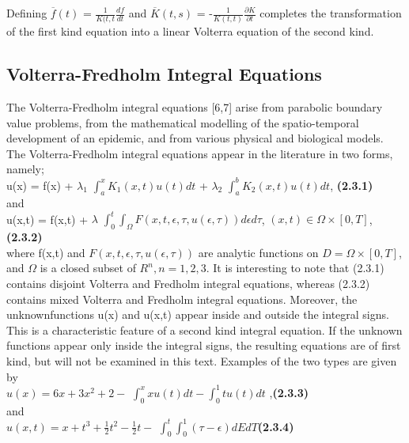 \documentclass[12pt]{article}
\begin{document}
Defining $\overline{f}(t)$ = $\frac{1}{K(t,t} \frac{df}{dt}$ and $\overline{K}(t,s)$ = -$\frac{1}{K(t,t)} \frac{\partial K}{\partial t}$ completes the transformation of the first kind equation into a linear Volterra equation of the second kind.

\subsection{Volterra-Fredholm Integral Equations}
The Volterra-Fredholm integral equations [6,7] arise from parabolic boundary value problems, from the mathematical modelling of the spatio-temporal development of an epidemic, and from various physical and biological models.
The Volterra-Fredholm integral equations appear in the literature in two forms, namely;\\

u(x) = f(x) + $\lambda_{1}$ \(\int_{a}^{x} K_{1}(x,t) u(t) dt\) + $\lambda_{2}$ \(\int_{a}^{b} K_{2}(x,t) u(t) dt\), \textbf{(2.3.1)}\\

and\\

u(x,t) = f(x,t) + $\lambda$ \(\int_{0}^{t} \int_{\Omega}F(x,t,\epsilon ,\tau , u(\epsilon ,\tau)) d\epsilon d\tau\), $(x,t) \in \Omega \times [0,T]$, \textbf{(2.3.2)}\\

where f(x,t) and $F(x,t,\epsilon , \tau,u(\epsilon , \tau))$ are analytic functions on $D = \Omega \times [0,T]$, and $\Omega$ is a closed subset of $R^n ,n =1 ,2,3$. It is interesting to note that (2.3.1) contains disjoint Volterra and Fredholm integral equations, whereas (2.3.2) contains mixed Volterra and Fredholm integral equations. Moreover, the unknownfunctions u(x) and u(x,t) appear inside and outside the integral signs. This is a characteristic feature of a second kind integral equation. If the unknown functions appear only inside the integral signs, the resulting equations are of ﬁrst kind, but will not be examined in this text. Examples of the two types are given by\\

$u(x) = 6x + 3x^2 + 2 -$ \(\int_{0}^{x} xu(t)dt - \int_{0}^{1} tu(t)dt\) ,\textbf{(2.3.3)}\\

and\\

$u(x,t) = x + t^3 + \frac{1}{2} t^2 - \frac{1}{2} t -$ \(\int_{0}^{t} \int_{0}^{1} (\tau - \epsilon)dEdT\)\textbf{(2.3.4)}\\
\end{document}
